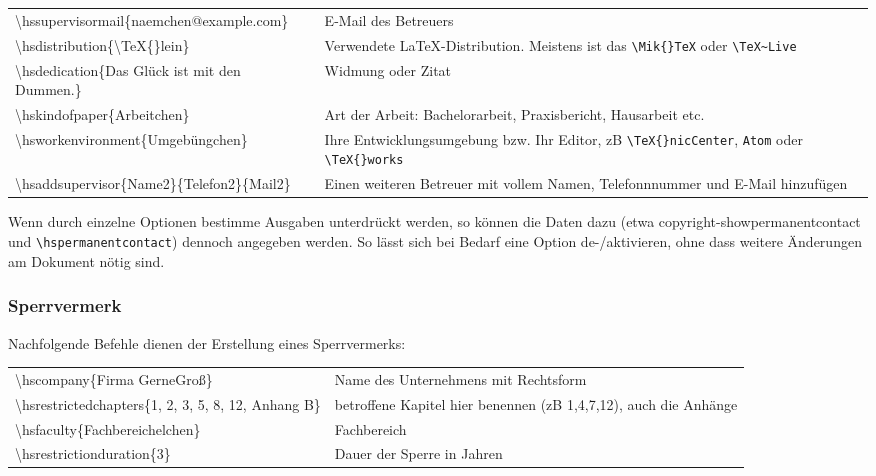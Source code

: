 \begin{tabularx}{\textwidth}{>{\ttfamily}lX}
	\textbackslash{}hssupervisormail\{naemchen@example.com\}
		& E-Mail des Betreuers
	\\[3ex]
	\textbackslash{}hsdistribution\{\textbackslash{}TeX\{\}lein\}
		& Verwendete LaTeX-Distribution. Meistens ist das
		\texttt{\textbackslash{}Mik\{\}TeX} oder
		\texttt{\textbackslash{}TeX\textasciitilde{}Live}
	\\[3ex]
	\textbackslash{}hsdedication\{Das Glück ist mit den Dummen.\}
		& Widmung oder Zitat
	\\[3ex]
	\textbackslash{}hskindofpaper\{Arbeitchen\}
		& Art der Arbeit: Bachelorarbeit, Praxisbericht, Hausarbeit etc.
	\\[3ex]
	\textbackslash{}hsworkenvironment\{Umgebüngchen\}
		& Ihre Entwicklungsumgebung bzw. Ihr Editor, zB
		\texttt{\textbackslash{}TeX\{\}nicCenter}, \texttt{Atom} oder
		\texttt{\textbackslash{}TeX\{\}works}
	\\[3ex]
	\textbackslash{}hsaddsupervisor\{Name2\}\{Telefon2\}\{Mail2\}
		& Einen weiteren Betreuer mit vollem Namen, Telefonnnummer und E-Mail
		hinzufügen
\end{tabularx}\endgroup

Wenn durch einzelne Optionen bestimme Ausgaben unterdrückt werden, so können die
Daten dazu (etwa copyright-showpermanentcontact und \verb!\hspermanentcontact!)
dennoch angegeben werden. So lässt sich bei Bedarf eine Option de-/aktivieren,
ohne dass weitere Änderungen am Dokument nötig sind.

\subsubsection{Sperrvermerk}
Nachfolgende Befehle dienen der Erstellung eines Sperrvermerks:

\par\begingroup\small\begin{tabularx}{\textwidth}{>{\ttfamily}lX}
	\textbackslash{}hscompany\{Firma GerneGroß\}
		& Name des Unternehmens mit Rechtsform
	\\[3ex]
	\textbackslash{}hsrestrictedchapters\{1, 2, 3, 5, 8, 12, Anhang B\}
		& betroffene Kapitel hier benennen (zB 1,4,7,12), auch die Anhänge
	\\[3ex]
	\textbackslash{}hsfaculty\{Fachbereichelchen\}
		& Fachbereich
	\\[3ex]
	\textbackslash{}hsrestrictionduration\{3\}
		& Dauer der Sperre in Jahren
\end{tabularx}\endgroup
